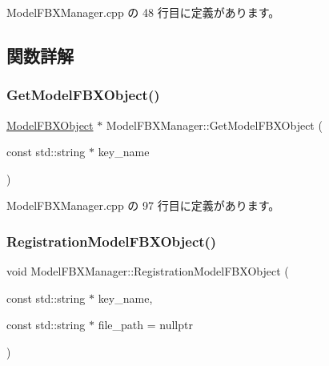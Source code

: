  Model\+F\+B\+X\+Manager.\+cpp の 48 行目に定義があります。



\subsection{関数詳解}
\mbox{\label{class_model_f_b_x_manager_abff9802a7edef85fd3b5de53d1d0b177}} 
\subsubsection{\texorpdfstring{Get\+Model\+F\+B\+X\+Object()}{GetModelFBXObject()}}
{\footnotesize\ttfamily \mbox{\hyperlink{class_model_f_b_x_object}{Model\+F\+B\+X\+Object}} $\ast$ Model\+F\+B\+X\+Manager\+::\+Get\+Model\+F\+B\+X\+Object (\begin{DoxyParamCaption}\item[{const std\+::string $\ast$}]{key\+\_\+name }\end{DoxyParamCaption})}



 Model\+F\+B\+X\+Manager.\+cpp の 97 行目に定義があります。

\mbox{\label{class_model_f_b_x_manager_a9a010cad6b7ddf07169daec28807b143}} 
\subsubsection{\texorpdfstring{Registration\+Model\+F\+B\+X\+Object()}{RegistrationModelFBXObject()}}
{\footnotesize\ttfamily void Model\+F\+B\+X\+Manager\+::\+Registration\+Model\+F\+B\+X\+Object (\begin{DoxyParamCaption}\item[{const std\+::string $\ast$}]{key\+\_\+name,  }\item[{const std\+::string $\ast$}]{file\+\_\+path = {\ttfamily nullptr} }\end{DoxyParamCaption})}



